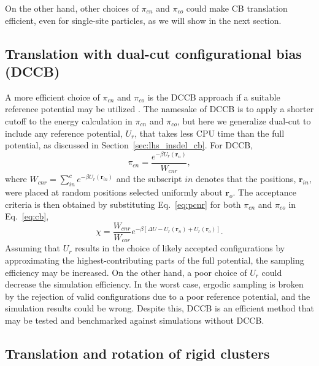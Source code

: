 \documentclass[
  9pt,
  bestpractices,
]{livecoms}
\begin{document}
On the other hand, other choices of $\pi_{cn}$ and $\pi_{co}$ could make CB translation efficient, even for single-site particles, as we will show in the next section.

\subsection{\label{sec:lhs_disp_dccb}Translation with dual-cut configurational bias (DCCB)}

A more efficient choice of $\pi_{cn}$ and $\pi_{co}$ is the DCCB approach if a suitable reference potential may be utilized \cite{vlugt_improving_1998}.
The namesake of DCCB is to apply a shorter cutoff to the energy calculation in $\pi_{cn}$ and $\pi_{co}$, but here we generalize dual-cut to include any reference potential, $U_r$, that takes less CPU time than the full potential, as discussed in Section~\ref{sec:lhs_insdel_cb}.
For DCCB,
\begin{equation}
\pi_{cn}=\frac{e^{-\beta U_r(\mathbf{r}_n)}}{W_{cnr}},
\label{eq:pcnr}
\end{equation}
where $W_{cnr}=\sum_{in}^c e^{-\beta U_r(\mathbf{r}_{in})}$ and the subscript $in$ denotes that the positions, $\mathbf{r}_{in}$, were placed at random positions selected uniformly about $\mathbf{r}_o$.
The acceptance criteria is then obtained by substituting Eq.~\ref{eq:pcnr} for both $\pi_{cn}$ and $\pi_{co}$ in Eq.~\ref{eq:cb},
\begin{equation}
\chi = \frac{W_{cnr}}{W_{cor}}e^{-\beta [\Delta U - U_r(\mathbf{r}_n) + U_r(\mathbf{r}_o)]}.
\end{equation}
Assuming that $U_r$ results in the choice of likely accepted configurations by approximating the highest-contributing parts of the full potential, the sampling efficiency may be increased.
On the other hand, a poor choice of $U_r$ could decrease the simulation efficiency.
In the worst case, ergodic sampling is broken by the rejection of valid configurations due to a poor reference potential, and the simulation results could be wrong.
Despite this, DCCB is an efficient method that may be tested and benchmarked against simulations without DCCB.

\subsection{\label{sec:lhs_cluster}Translation and rotation of rigid clusters}
\end{document}
